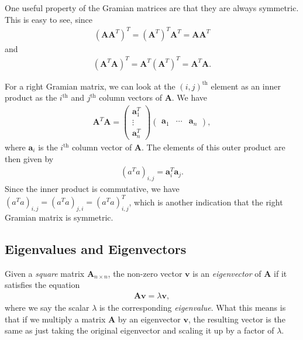 \documentclass[10pt]{article}
\newcommand{\mydef}[1]{\textcolor{SteelBlue3}{\textit{#1}}} %
\begin{document}
One useful property of the Gramian matrices are that they are always symmetric. This is easy to see, since 
\begin{align*}
    (\mathbf{A} \mathbf{A}^T)^T = (\mathbf{A}^T)^T \mathbf{A}^T = \mathbf{A} \mathbf{A}^T
\end{align*}
and 
\begin{align*}
    (\mathbf{A}^T \mathbf{A})^T = \mathbf{A}^T (\mathbf{A}^T)^T = \mathbf{A}^T \mathbf{A}.
\end{align*}

For a right Gramian matrix, we can look at the $(i,j)^{\text{th}}$ element as an inner product as the $i^{\text{th}}$ and $j^{\text{th}}$ column vectors of $\mathbf{A}$. We have 
\begin{align*}
    \mathbf{A}^T \mathbf{A} = \begin{pmatrix}
        \mathbf{a}_1^T \\ \vdots \\ \mathbf{a}_n^T
    \end{pmatrix} 
    \begin{pmatrix}
        \mathbf{a}_1 & \cdots & \mathbf{a}_n
    \end{pmatrix},
\end{align*}
where $\mathbf{a}_i$ is the $i^{\text{th}}$ column vector of $\mathbf{A}$. The elements of this outer product are then given by 
\begin{align}
    \label{rightgramianelements}
    (a^T a)_{i,j} = \mathbf{a}_i^T \mathbf{a}_j.
\end{align}
Since the inner product is commutative, we have $(a^T a)_{i,j} = (a^T a)_{j,i} = (a^T a)_{i,j}^T$, which is another indication that the right Gramian matrix is symmetric. 

\subsection{Eigenvalues and Eigenvectors}

Given a \textit{square} matrix $\mathbf{A}_{n \times n}$, the non-zero vector $\mathbf{v}$ is an \mydef{eigenvector} of $\mathbf{A}$ if it satisfies the equation 
\begin{align}
    \label{eigenvector}
    \mathbf{A} \mathbf{v} = \lambda \mathbf{v},
\end{align}
where we say the scalar $\lambda$ is the corresponding \mydef{eigenvalue}. What this means is that if we multiply a matrix $\mathbf{A}$ by an eigenvector $\mathbf{v}$, the resulting vector is the same as just taking the original eigenvector and scaling it up by a factor of $\lambda$. 
\end{document}
